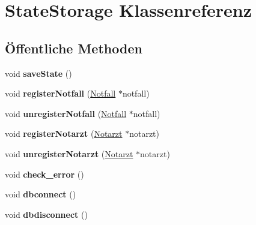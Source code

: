 \hypertarget{classStateStorage}{}\section{State\+Storage Klassenreferenz}
\label{classStateStorage}
\subsection*{Öffentliche Methoden}
\begin{DoxyCompactItemize}
\item 
void {\bfseries save\+State} ()\hypertarget{classStateStorage_a98b81c44bf10a560c13c20dadf4edb8b}{}\label{classStateStorage_a98b81c44bf10a560c13c20dadf4edb8b}

\item 
void {\bfseries register\+Notfall} (\hyperlink{classNotfall}{Notfall} $\ast$notfall)\hypertarget{classStateStorage_ab0db339611f52d600525780596f1c836}{}\label{classStateStorage_ab0db339611f52d600525780596f1c836}

\item 
void {\bfseries unregister\+Notfall} (\hyperlink{classNotfall}{Notfall} $\ast$notfall)\hypertarget{classStateStorage_a231238d0d1323f35f122758b60a5f57e}{}\label{classStateStorage_a231238d0d1323f35f122758b60a5f57e}

\item 
void {\bfseries register\+Notarzt} (\hyperlink{classNotarzt}{Notarzt} $\ast$notarzt)\hypertarget{classStateStorage_a58fbeab4cfe7baff4074e354898d5ade}{}\label{classStateStorage_a58fbeab4cfe7baff4074e354898d5ade}

\item 
void {\bfseries unregister\+Notarzt} (\hyperlink{classNotarzt}{Notarzt} $\ast$notarzt)\hypertarget{classStateStorage_aff781895425916eb0fe251ec0cccfcfe}{}\label{classStateStorage_aff781895425916eb0fe251ec0cccfcfe}

\item 
void {\bfseries check\+\_\+error} ()\hypertarget{classStateStorage_af0501a41dad1506616ed783e6181cb05}{}\label{classStateStorage_af0501a41dad1506616ed783e6181cb05}

\item 
void {\bfseries dbconnect} ()\hypertarget{classStateStorage_afaa0feafcaf5d241aefd34b53563d25e}{}\label{classStateStorage_afaa0feafcaf5d241aefd34b53563d25e}

\item 
void {\bfseries dbdisconnect} ()\hypertarget{classStateStorage_ae858cb92232b1b097364803e1677670e}{}\label{classStateStorage_ae858cb92232b1b097364803e1677670e}


\end{DoxyCompactItemize}

